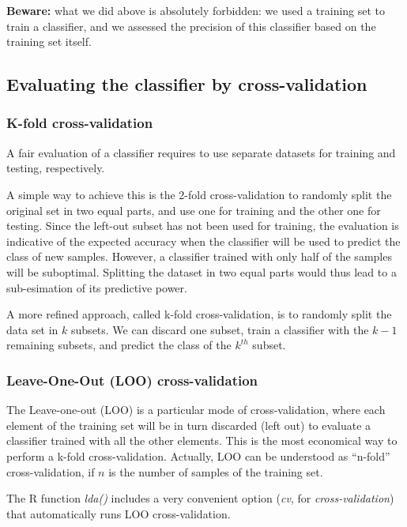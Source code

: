 \textbf{Beware:} what we did above is absolutely forbidden: we used a
training set to train a classifier, and we assessed the precision of
this classifier based on the training set itself.

\subsection{Evaluating the classifier by
cross-validation}\label{evaluating-the-classifier-by-cross-validation}

\subsubsection{K-fold cross-validation}\label{k-fold-cross-validation}

A fair evaluation of a classifier requires to use separate datasets for
training and testing, respectively.

A simple way to achieve this is the {2-fold cross-validation} to
randomly split the original set in two equal parts, and use one for
training and the other one for testing. Since the left-out subset has
not been used for training, the evaluation is indicative of the expected
accuracy when the classifier will be used to predict the class of new
samples. However, a classifier trained with only half of the samples
will be suboptimal. Splitting the dataset in two equal parts would thus
lead to a sub-esimation of its predictive power.

A more refined approach, called {k-fold cross-validation}, is to
randomly split the data set in $k$ subsets. We can discard one subset,
train a classifier with the $k-1$ remaining subsets, and predict the
class of the $k^{th}$ subset.

\subsubsection{Leave-One-Out (LOO)
cross-validation}\label{leave-one-out-loo-cross-validation}

The {Leave-one-out} ({LOO}) is a particular mode of cross-validation,
where each element of the training set will be in turn discarded (left
out) to evaluate a classifier trained with all the other elements. This
is the most economical way to perform a k-fold cross-validation.
Actually, LOO can be understood as ``n-fold'' cross-validation, if $n$
is the number of samples of the training set.

The R function \emph{lda()} includes a very convenient option
(\emph{cv}, for \emph{cross-validation}) that automatically runs LOO
cross-validation.

